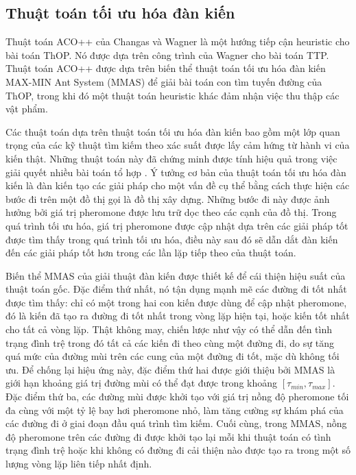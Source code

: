 \subsection{Thuật toán tối ưu hóa đàn kiến} \label{section:ACO++}
Thuật toán ACO++ của Changas và Wagner là một hướng tiếp cận heuristic cho bài toán ThOP. Nó được dựa trên công trình của Wagner cho bài toán TTP. Thuật toán ACO++ được dựa trên biến thể thuật toán tối ưu hóa đàn kiến MAX-MIN Ant System (MMAS) để giải bài toán con tìm tuyến đường của ThOP, trong khi đó một thuật toán heuristic khác đảm nhận việc thu thập các vật phẩm.

Các thuật toán dựa trên thuật toán tối ưu hóa đàn kiến bao gồm một lớp quan trọng của các kỹ thuật tìm kiếm theo xác suất được lấy cảm hứng từ hành vi của kiến thật. Những thuật toán này đã chứng minh được tính hiệu quả trong việc giải quyết nhiều bài toán tổ hợp \cite{DORIGO2005243}. Ý tưởng cơ bản của thuật toán tối ưu hóa đàn kiến là đàn kiến tạo các giải pháp cho một vấn đề cụ thể bằng cách thực hiện các bước đi trên một đồ thị gọi là đồ thị xây dựng. Những bước đi này được ảnh hưởng bởi giá trị pheromone được lưu trữ dọc theo các cạnh của đồ thị. Trong quá trình tối ưu hóa, giá trị pheromone được cập nhật dựa trên các giải pháp tốt được tìm thấy trong quá trình tối ưu hóa, điều này sau đó sẽ dẫn dắt đàn kiến đến các giải pháp tốt hơn trong các lần lặp tiếp theo của thuật toán.

Biến thể MMAS của giải thuật đàn kiến được thiết kế để cái thiện hiệu suất của thuật toán gốc. Đặc điểm thứ nhất, nó tận dụng mạnh mẽ các đường đi tốt nhất được tìm thấy: chỉ có một trong hai con kiến được dùng để cập nhật pheromone, đó là kiến đã tạo ra đường đi tốt nhất trong vòng lặp hiện tại, hoặc kiến tốt nhất cho tất cả vòng lặp. Thật không may, chiến lược như vậy có thể dẫn đến tình trạng đình trệ trong đó tất cả các kiến đi theo cùng một đường đi, do sự tăng quá mức của đường mùi trên các cung của một đường đi tốt, mặc dù không tối ưu. Để chống lại hiệu ứng này, đặc điểm thứ hai được giới thiệu bởi MMAS là giới hạn khoảng giá trị đường mùi có thể đạt được trong khoảng $[\tau_{min},\tau_{max}]$. Đặc điểm thứ ba, các đường mùi được khởi tạo với giá trị nồng độ pheromone tối đa cùng với một tỷ lệ bay hơi pheromone nhỏ, làm tăng cường sự khám phá của các đường đi ở giai đoạn đầu quá trình tìm kiếm. Cuối cùng, trong MMAS, nồng độ pheromone trên các đường đi được khởi tạo lại mỗi khi thuật toán có tình trạng đình trệ hoặc khi không có đường đi cải thiện nào được tạo ra trong một số lượng vòng lặp liên tiếp nhất định.

